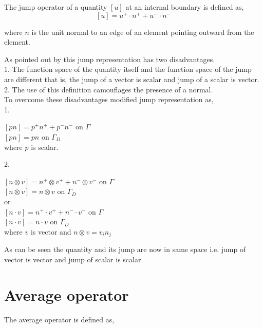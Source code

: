 \documentclass[a4paper,12pt]{book}
\begin{document}
The jump operator of a quantity $[u]$ at an internal boundary is defined as,
\begin{equation}\label{jump operator}
[u]=u^+ \cdot n^+ + u^- \cdot n^-
\end{equation}

where $n$ is the unit normal to an edge of an element pointing outward from the element.

As pointed out by \cite{Montlaur2} this jump representation has two disadvantages.\\

1. The function space of the quantity itself and the function space of the jump are different that is, the jump of a vector is scalar and jump of a scalar is vector.\\
2. The use of this definition camouflages the presence of a normal.\\

To overcome these disadvantages \cite{Montlaur2} modified jump representation as,\\

1.  
\begin{center}
$[pn] = p^+ n^+ + p^- n^- $ on $\Gamma$\\
$[pn] = p n $ on $\Gamma_D$\\
where $p$ is scalar.
\end{center}

2. \\
\begin{center}
$[n \otimes v] = n^+ \otimes v^+ + n^- \otimes v^-$ on $\Gamma$\\
$[n \otimes v] = n \otimes v$ on $\Gamma_D$\\
 or \\
$[n \cdot v] = n^+ \cdot v^+ + n^- \cdot v^-$ on $\Gamma$\\
$[n \cdot v] = n \cdot v$ on $\Gamma_D$\\
where $v$ is vector and $n \otimes v = v_i n_j$\\ 
\end{center}

As can be seen the quantity and its jump are now in same space i.e. jump of vector is vector and jump of scalar is scalar.

\section{Average operator}

The average operator is defined as,
\end{document}
